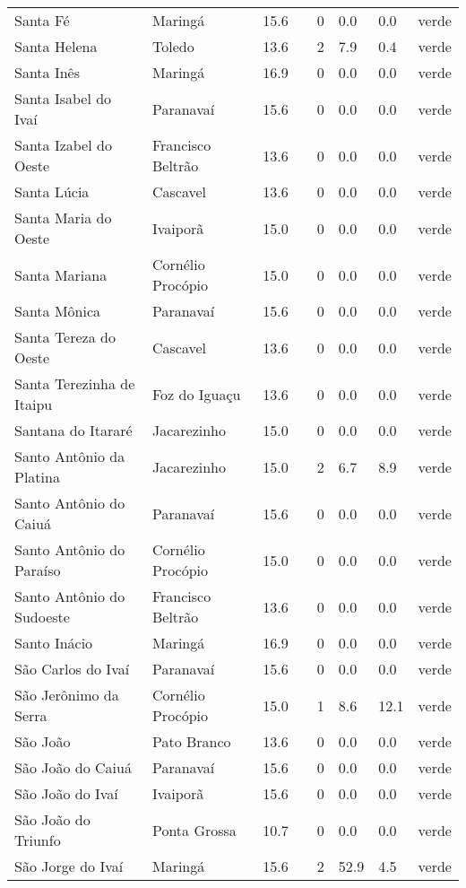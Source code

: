 \begin{longtable}{l|lllllll}
  Santa Fé & Maringá & 15.6 &  & 0 & 0.0 & 0.0 & verde \\ 
  Santa Helena & Toledo & 13.6 &  & 2 & 7.9 & 0.4 & verde \\ 
  Santa Inês & Maringá & 16.9 &  & 0 & 0.0 & 0.0 & verde \\ 
  Santa Isabel do Ivaí & Paranavaí & 15.6 &  & 0 & 0.0 & 0.0 & verde \\ 
  Santa Izabel do Oeste & Francisco Beltrão & 13.6 &  & 0 & 0.0 & 0.0 & verde \\ 
  Santa Lúcia & Cascavel & 13.6 &  & 0 & 0.0 & 0.0 & verde \\ 
  Santa Maria do Oeste & Ivaiporã & 15.0 &  & 0 & 0.0 & 0.0 & verde \\ 
  Santa Mariana & Cornélio Procópio & 15.0 &  & 0 & 0.0 & 0.0 & verde \\ 
  Santa Mônica & Paranavaí & 15.6 &  & 0 & 0.0 & 0.0 & verde \\ 
  Santa Tereza do Oeste & Cascavel & 13.6 &  & 0 & 0.0 & 0.0 & verde \\ 
  Santa Terezinha de Itaipu & Foz do Iguaçu & 13.6 &  & 0 & 0.0 & 0.0 & verde \\ 
  Santana do Itararé & Jacarezinho & 15.0 &  & 0 & 0.0 & 0.0 & verde \\ 
  Santo Antônio da Platina & Jacarezinho & 15.0 &  & 2 & 6.7 & 8.9 & verde \\ 
  Santo Antônio do Caiuá & Paranavaí & 15.6 &  & 0 & 0.0 & 0.0 & verde \\ 
  Santo Antônio do Paraíso & Cornélio Procópio & 15.0 &  & 0 & 0.0 & 0.0 & verde \\ 
  Santo Antônio do Sudoeste & Francisco Beltrão & 13.6 &  & 0 & 0.0 & 0.0 & verde \\ 
  Santo Inácio & Maringá & 16.9 &  & 0 & 0.0 & 0.0 & verde \\ 
  São Carlos do Ivaí & Paranavaí & 15.6 &  & 0 & 0.0 & 0.0 & verde \\ 
  São Jerônimo da Serra & Cornélio Procópio & 15.0 &  & 1 & 8.6 & 12.1 & verde \\ 
  São João & Pato Branco & 13.6 &  & 0 & 0.0 & 0.0 & verde \\ 
  São João do Caiuá & Paranavaí & 15.6 &  & 0 & 0.0 & 0.0 & verde \\ 
  São João do Ivaí & Ivaiporã & 15.6 &  & 0 & 0.0 & 0.0 & verde \\ 
  São João do Triunfo & Ponta Grossa & 10.7 &  & 0 & 0.0 & 0.0 & verde \\ 
  São Jorge do Ivaí & Maringá & 15.6 &  & 2 & 52.9 & 4.5 & verde \\ 

\end{longtable}
